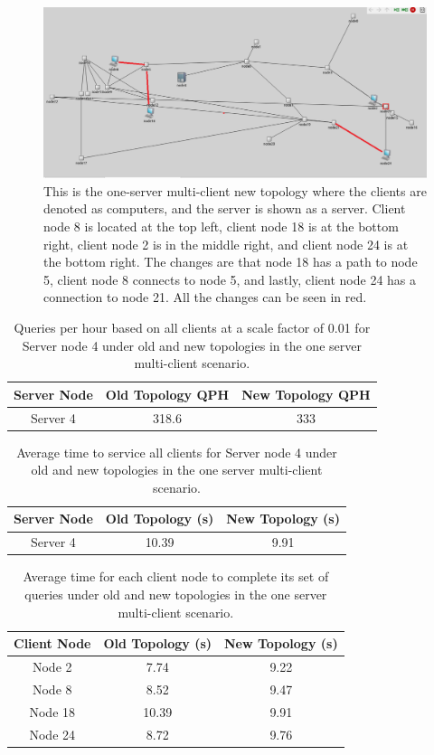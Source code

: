 \begin{figure}[tp]
\centering
\includegraphics[width=0.5 \textwidth]{figures/MultClientNew}
\caption{This is the one-server multi-client new topology where the clients are denoted as computers, and the server is shown as a server. Client node 8 is located at the top left, client node 18 is at the bottom right, client node 2 is in the middle right, and client node 24 is at the bottom right. The changes are that node 18 has a path to node 5, client node 8 connects to node 5, and lastly, client node 24 has a connection to node 21. All the changes can be seen in red.}
\end{figure}

\begin{table}[h!]
\centering
\begin{tabular}{|c|c|c|}
\hline
Server Node & Old Topology QPH & New Topology QPH \\ \hline
Server 4 & 318.6 & 333 \\ \hline
\end{tabular}
\caption{Queries per hour based on all clients at a scale factor of 0.01 for Server node 4 under old and new topologies in the one server multi-client scenario.}
\label{tab:my_label}
\end{table}


\begin{table}[h!]
\centering
\begin{tabular}{|c|c|c|}
\hline
Server Node & Old Topology (s) & New Topology (s) \\ \hline
Server 4 & 10.39 & 9.91  \\ \hline
\end{tabular}
\caption{Average time to service all clients for Server node 4 under old and new topologies in the one server multi-client scenario.}
\label{tab:average_time}
\end{table}

\begin{table}[h!]
\centering
\begin{tabular}{|c|c|c|}
\hline
Client Node & Old Topology (s) & New Topology (s) \\ \hline
Node 2 & 7.74 & 9.22  \\ \hline
Node 8 & 8.52 & 9.47 \\ \hline
Node 18 & 10.39 & 9.91 \\ \hline
Node 24 & 8.72 & 9.76 \\ \hline
\end{tabular}
\caption{Average time for each client node to complete its set of queries under old and new topologies in the one server multi-client scenario.}
\label{tab:avg_time_per_node}
\end{table}



